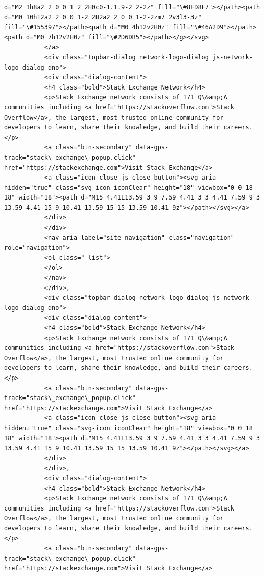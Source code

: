 \documentclass[11pt]{article}
\begin{document}
\begin{Verbatim}[commandchars=\\\{\}]
d="M2 1h8a2 2 0 0 1 2 2H0c0-1.1.9-2 2-2z" fill="\#8FD8F7"></path><path d="M0 10h12a2 2 0 0 1-2 2H2a2 2 0 0 1-2-2zm7 2v3l3-3z" fill="\#155397"></path><path d="M0 4h12v2H0z" fill="\#46A2D9"></path><path d="M0 7h12v2H0z" fill="\#2D6DB5"></path></g></svg>
           </a>
           <div class="topbar-dialog network-logo-dialog js-network-logo-dialog dno">
           <div class="dialog-content">
           <h4 class="bold">Stack Exchange Network</h4>
           <p>Stack Exchange network consists of 171 Q\&amp;A communities including <a href="https://stackoverflow.com">Stack Overflow</a>, the largest, most trusted online community for developers to learn, share their knowledge, and build their careers.</p>
           <a class="btn-secondary" data-gps-track="stack\_exchange\_popup.click" href="https://stackexchange.com">Visit Stack Exchange</a>
           <a class="icon-close js-close-button"><svg aria-hidden="true" class="svg-icon iconClear" height="18" viewbox="0 0 18 18" width="18"><path d="M15 4.41L13.59 3 9 7.59 4.41 3 3 4.41 7.59 9 3 13.59 4.41 15 9 10.41 13.59 15 15 13.59 10.41 9z"></path></svg></a>
           </div>
           </div>
           <nav aria-label="site navigation" class="navigation" role="navigation">
           <ol class="-list">
           </ol>
           </nav>
           </div>,
           <div class="topbar-dialog network-logo-dialog js-network-logo-dialog dno">
           <div class="dialog-content">
           <h4 class="bold">Stack Exchange Network</h4>
           <p>Stack Exchange network consists of 171 Q\&amp;A communities including <a href="https://stackoverflow.com">Stack Overflow</a>, the largest, most trusted online community for developers to learn, share their knowledge, and build their careers.</p>
           <a class="btn-secondary" data-gps-track="stack\_exchange\_popup.click" href="https://stackexchange.com">Visit Stack Exchange</a>
           <a class="icon-close js-close-button"><svg aria-hidden="true" class="svg-icon iconClear" height="18" viewbox="0 0 18 18" width="18"><path d="M15 4.41L13.59 3 9 7.59 4.41 3 3 4.41 7.59 9 3 13.59 4.41 15 9 10.41 13.59 15 15 13.59 10.41 9z"></path></svg></a>
           </div>
           </div>,
           <div class="dialog-content">
           <h4 class="bold">Stack Exchange Network</h4>
           <p>Stack Exchange network consists of 171 Q\&amp;A communities including <a href="https://stackoverflow.com">Stack Overflow</a>, the largest, most trusted online community for developers to learn, share their knowledge, and build their careers.</p>
           <a class="btn-secondary" data-gps-track="stack\_exchange\_popup.click" href="https://stackexchange.com">Visit Stack Exchange</a>

\end{Verbatim}
\end{document}
